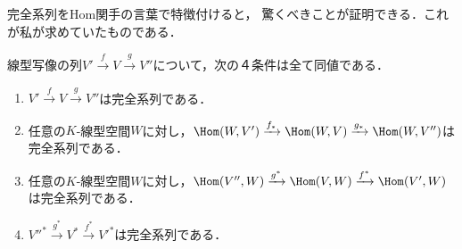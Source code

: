 \documentclass[uplatex, dvipdfmx]{jsreport}
\begin{document}
\begin{tcolorbox}[colframe=ForestGreen, colback=ForestGreen!10!white,breakable,colbacktitle=ForestGreen!40!white,coltitle=black,fonttitle=\bfseries\sffamily,
title=]
    完全系列をHom関手の言葉で特徴付けると，
    驚くべきことが証明できる．これが私が求めていたものである．
\end{tcolorbox}

\begin{proposition}[完全系列の普遍性]\label{proposition-universality-of-exact-sequence}
    線型写像の列$V'\xrightarrow{f}V\xrightarrow{g}V''$について，次の４条件は全て同値である．
    \begin{enumerate}
        \item $V'\xrightarrow{f}V\xrightarrow{g}V''$は完全系列である．
        \item 任意の$K$-線型空間$W$に対し，$\Hom(W,V')\xrightarrow{f_*}\Hom(W,V)\xrightarrow{g_*}\Hom(W,V'')$は完全系列である．
        \item 任意の$K$-線型空間$W$に対し，$\Hom(V'',W)\xrightarrow{g^*}\Hom(V,W)\xrightarrow{f^*}\Hom(V',W)$は完全系列である．
        \item $V''^*\xrightarrow{g^*}V^*\xrightarrow{f^*}V'^*$は完全系列である．
    \end{enumerate}
\end{proposition}
\end{document}
